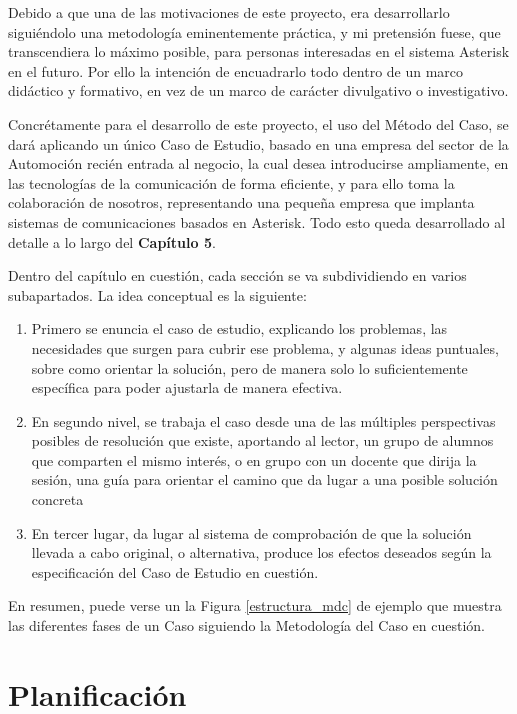 Debido a que una de las motivaciones de este proyecto, era desarrollarlo siguiéndolo una metodología eminentemente práctica, y mi pretensión fuese, que transcendiera lo máximo posible, para personas interesadas en el sistema Asterisk en el futuro. Por ello la intención de encuadrarlo todo dentro de un marco didáctico y formativo, en vez de un marco de carácter divulgativo o investigativo.

Concrétamente para el desarrollo de este proyecto, el uso del Método del Caso, se dará aplicando un único Caso de Estudio, basado en una empresa del sector de la Automoción recién entrada al negocio, la cual desea introducirse ampliamente, en las tecnologías de la comunicación de forma eficiente, y para ello toma la colaboración de nosotros, representando una pequeña empresa que implanta sistemas de comunicaciones basados en Asterisk. Todo esto queda desarrollado al detalle a lo largo del \textbf{Capítulo 5}.

Dentro del capítulo en cuestión, cada sección se va subdividiendo en varios subapartados. La idea conceptual es la siguiente:


\begin{enumerate}
	\item Primero se enuncia el caso de estudio, explicando los problemas, las necesidades que surgen para cubrir ese problema, y algunas ideas puntuales, sobre como orientar la solución, pero de manera solo lo suficientemente específica para poder ajustarla de manera efectiva.
	\item En segundo nivel, se trabaja el caso desde una de las múltiples perspectivas posibles de resolución que existe, aportando al lector, un grupo de alumnos que comparten el mismo interés, o en grupo con un docente que dirija la sesión, una guía para orientar el camino que da lugar a una posible solución concreta
	\item En tercer lugar, da lugar al sistema de comprobación de que la solución llevada a cabo original, o alternativa, produce los efectos deseados según la especificación del Caso de Estudio en cuestión.
\end{enumerate}

En resumen, puede verse un la Figura \ref{estructura_mdc} de ejemplo que muestra las diferentes fases de un Caso siguiendo la Metodología del Caso en cuestión.


\section{Planificación}

